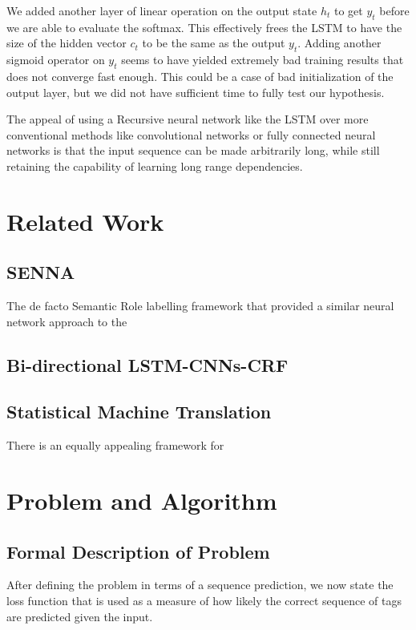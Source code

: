 \documentclass[fyp]{socreport}
\begin{document}
We added another layer of linear operation on the output state $h_t$ to get
$y_t$ before we are able to evaluate the softmax. This effectively frees the
LSTM to have the size of the hidden vector $c_t$ to be the same as the output
$y_t$. Adding another sigmoid operator on $y_t$ seems to have yielded extremely
bad training results that does not converge fast enough. This could be a case
of bad initialization of the output layer, but we did not have sufficient time
to fully test our hypothesis.

The appeal of using a Recursive neural network like the LSTM over more
conventional methods like convolutional networks or fully connected neural
networks is that the input sequence can be made arbitrarily long, while still
retaining the capability of learning long range dependencies.


\chapter{Related Work}
\section{SENNA}
The de facto Semantic Role labelling framework that provided a similar
neural network approach to the \cite{DBLP2011Collobert}

\section{Bi-directional LSTM-CNNs-CRF}


\section{Statistical Machine Translation}
There is an equally appealing framework for


\label{ch:related}


\chapter{Problem and Algorithm}
\section{Formal Description of Problem}
After defining the problem in terms of a sequence prediction, we now state the
loss function that is used as a measure of how likely the correct sequence of
tags are predicted given the input.
\end{document}
